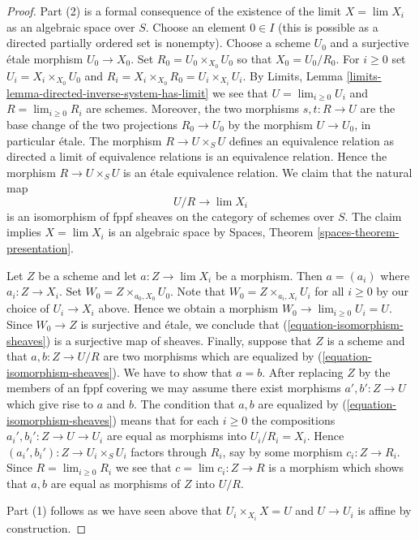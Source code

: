 \begin{proof}
Part (2) is a formal consequence of the existence of the
limit $X = \lim X_i$ as an algebraic space over $S$.
Choose an element $0 \in I$ (this is possible as a directed partially
ordered set is nonempty). Choose a scheme $U_0$ and a surjective
\'etale morphism $U_0 \to X_0$. Set $R_0 = U_0 \times_{X_0} U_0$
so that $X_0 = U_0/R_0$. For $i \geq 0$ set
$U_i = X_i \times_{X_0} U_0$ and
$R_i = X_i \times_{X_0} R_0 = U_i \times_{X_i} U_i$.
By Limits, Lemma \ref{limits-lemma-directed-inverse-system-has-limit}
we see that $U = \lim_{i \geq 0} U_i$ and $R = \lim_{i \geq 0} R_i$
are schemes. Moreover, the two morphisms $s, t : R \to U$ are the base
change of the two projections $R_0 \to U_0$ by the morphism
$U \to U_0$, in particular \'etale. The morphism $R \to U \times_S U$
defines an equivalence relation as directed a limit of equivalence relations
is an equivalence relation. Hence the morphism
$R \to U \times_S U$ is an \'etale equivalence relation. We claim that
the natural map
\begin{equation}
\label{equation-isomorphism-sheaves}
U/R \longrightarrow \lim X_i
\end{equation}
is an isomorphism of fppf sheaves on the category of schemes over $S$.
The claim implies $X = \lim X_i$ is an algebraic
space by Spaces, Theorem \ref{spaces-theorem-presentation}.

\medskip\noindent
Let $Z$ be a scheme and let $a : Z \to \lim X_i$ be a morphism.
Then $a = (a_i)$ where $a_i : Z \to X_i$. Set $W_0 = Z \times_{a_0, X_0} U_0$.
Note that $W_0 = Z \times_{a_i, X_i} U_i$ for all $i \geq 0$ by our
choice of $U_i \to X_i$ above. Hence we obtain a morphism
$W_0 \to \lim_{i \geq 0} U_i = U$. Since $W_0 \to Z$ is surjective
and \'etale, we conclude that (\ref{equation-isomorphism-sheaves})
is a surjective map of sheaves. Finally, suppose that
$Z$ is a scheme and that $a, b : Z \to U/R$ are two morphisms
which are equalized by (\ref{equation-isomorphism-sheaves}).
We have to show that $a = b$.
After replacing $Z$ by the members of an fppf covering
we may assume there exist morphisms $a', b' : Z \to U$ which
give rise to $a$ and $b$. The condition that $a, b$ are
equalized by (\ref{equation-isomorphism-sheaves}) means that
for each $i \geq 0$ the compositions $a_i', b_i' : Z \to U \to U_i$
are equal as morphisms into $U_i/R_i = X_i$. Hence
$(a_i', b_i') : Z \to U_i \times_S U_i$ factors through
$R_i$, say by some morphism $c_i : Z \to R_i$. Since
$R = \lim_{i \geq 0} R_i$ we see that $c = \lim c_i : Z \to R$
is a morphism which shows that $a, b$ are equal as morphisms
of $Z$ into $U/R$.

\medskip\noindent
Part (1) follows as we have seen above that
$U_i \times_{X_i} X = U$ and $U \to U_i$ is affine by
construction.
\end{proof}

